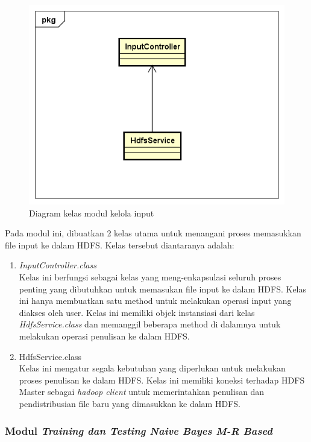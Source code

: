 \begin{figure}[H]
	\centering
	\includegraphics[scale=0.7]{ClassDiagram/Simple_CD_Input}
	\caption[Diagram kelas modul kelola input]{Diagram kelas modul kelola input}
	\label{fig:Diagram kelas modul kelola input}
\end{figure}

Pada modul ini, dibuatkan 2 kelas utama untuk menangani proses memasukkan file input ke dalam HDFS. Kelas tersebut diantaranya adalah:
\begin{enumerate}
\item{\textit{InputController.class}} \\
Kelas ini berfungsi sebagai kelas yang meng-enkapsulasi seluruh proses penting yang dibutuhkan untuk memasukan file input ke dalam HDFS. Kelas ini hanya membuatkan satu method untuk melakukan operasi input yang diakses oleh user. Kelas ini memiliki objek instansiasi dari kelas \textit{HdfsService.class} dan memanggil beberapa method di dalamnya untuk melakukan operasi penulisan ke dalam HDFS.
\item{HdfsService.class} \\
Kelas ini mengatur segala kebutuhan yang diperlukan untuk melakukan proses penulisan ke dalam HDFS. Kelas ini memiliki koneksi terhadap HDFS Master sebagai \textit{hadoop client} untuk memerintahkan penulisan dan pendistribusian file baru yang dimasukkan ke dalam HDFS.
\end{enumerate}

\subsubsection{Modul \textit{Training dan Testing Naive Bayes M-R Based}}
\label{subsubsec:Modul Training dan Testing Naive Bayes M-R Based}

